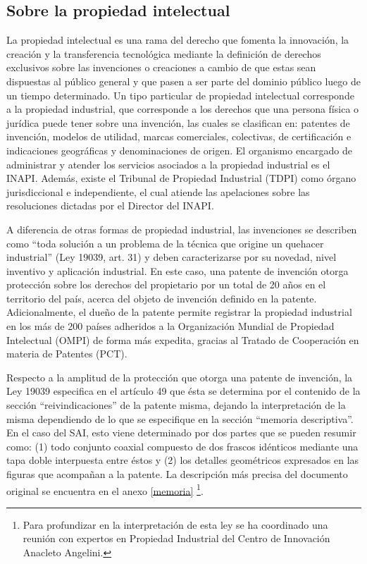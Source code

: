 \subsection{Sobre la propiedad intelectual}

La propiedad intelectual es una rama del derecho que fomenta la innovación, la creación y la transferencia tecnológica mediante la definición de derechos exclusivos sobre las invenciones o creaciones a cambio de que estas sean dispuestas al público general y que pasen a ser parte del dominio público luego de un tiempo determinado.  Un tipo particular de propiedad intelectual corresponde a la propiedad industrial, que corresponde a los derechos que una persona física o jurídica puede tener sobre una invención, las cuales se clasifican en: patentes de invención, modelos de utilidad, marcas comerciales, colectivas, de certificación e indicaciones geográficas y denominaciones de origen. El organismo encargado de administrar y atender los servicios asociados a la propiedad industrial es el INAPI. Además, existe el Tribunal de Propiedad Industrial (TDPI) como órgano jurisdiccional e independiente, el cual atiende las apelaciones sobre las resoluciones dictadas por el Director del INAPI.

A diferencia de otras formas de propiedad industrial, las invenciones se describen como “toda solución a un problema de la técnica que origine un quehacer industrial” (Ley 19039, art. 31) y deben caracterizarse por su novedad, nivel inventivo y aplicación industrial. En este caso, una patente de invención otorga protección sobre los derechos del propietario por un total de 20 años en el territorio del país, acerca del objeto de invención definido en la patente. Adicionalmente, el dueño de la patente permite registrar la propiedad industrial en los más de 200 países adheridos a la Organización Mundial de Propiedad Intelectual (OMPI) de forma más expedita, gracias al Tratado de Cooperación en materia de Patentes (PCT).

Respecto a la amplitud de la protección que otorga una patente de invención, la Ley 19039 especifica en el artículo 49 que ésta se determina por el contenido de la sección “reivindicaciones” de la patente misma, dejando la interpretación de la misma dependiendo de lo que se especifique en la sección “memoria descriptiva”. En el caso del SAI,  esto viene determinado por dos partes que se pueden resumir como: (1) todo conjunto coaxial compuesto de dos frascos idénticos mediante una tapa doble interpuesta entre éstos y (2) los detalles geométricos  expresados en las figuras que acompañan a la patente. La descripción más precisa del documento original se encuentra en el anexo \ref{memoria}
\footnote{Para profundizar en la interpretación de esta ley se ha coordinado una reunión con expertos en Propiedad Industrial del Centro de Innovación Anacleto Angelini.}.


